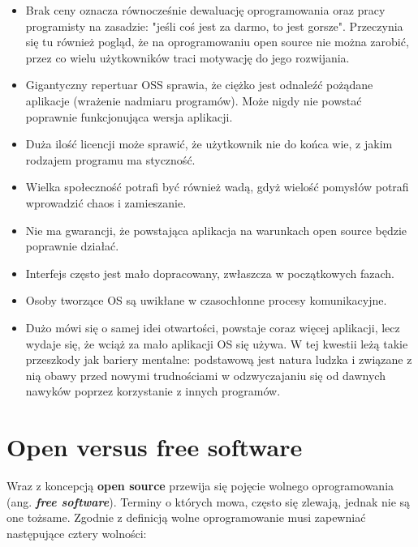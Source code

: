 \documentclass{article}
\begin{document}
\begin{itemize}
    \item Brak ceny oznacza równocześnie dewaluację oprogramowania oraz pracy programisty na zasadzie: "jeśli coś jest za darmo, to jest gorsze". Przeczynia się tu również pogląd, że na oprogramowaniu open source nie można zarobić, przez co wielu użytkowników traci motywację do jego rozwijania\cite{Kotula}.
    
    \item Gigantyczny repertuar OSS sprawia, że ciężko jest odnaleźć pożądane aplikacje (wrażenie nadmiaru programów). Może nigdy nie powstać poprawnie funkcjonująca wersja aplikacji\cite{Kotula}.
    
    \item Duża ilość licencji może sprawić, że użytkownik nie do końca wie, z jakim rodzajem programu ma styczność\cite{Kotula}.
    
    \item Wielka społeczność potrafi być również wadą, gdyż wielość pomysłów potrafi wprowadzić chaos i zamieszanie\cite{Kotula}.
    
    \item Nie ma gwarancji, że powstająca aplikacja na warunkach open source będzie poprawnie działać\cite{Kotula}.
    
    \item Interfejs często jest mało dopracowany, zwłaszcza w początkowych fazach\cite{Kotula}.
    
    \item Osoby tworzące OS są uwikłane w czasochłonne procesy komunikacyjne\cite{Kotula}.
    
    \item Dużo mówi się o samej idei otwartości, powstaje coraz więcej aplikacji, lecz wydaje się, że wciąż za mało aplikacji OS się używa. W tej kwestii leżą takie przeszkody jak bariery mentalne: podstawową jest natura ludzka i związane z nią obawy przed nowymi trudnościami w odzwyczajaniu się od dawnych nawyków poprzez korzystanie z innych programów\cite{Kotula}.
\end{itemize}

\section{Open versus free software}

\hspace{4mm} Wraz z koncepcją \textbf{open source} przewija się pojęcie wolnego oprogramowania (ang. \textbf{\emph{free software}}). Terminy o których mowa, często się zlewają, jednak nie są one tożsame. Zgodnie z definicją wolne oprogramowanie musi zapewniać następujące cztery wolności\cite{Webbink}:
\end{document}
